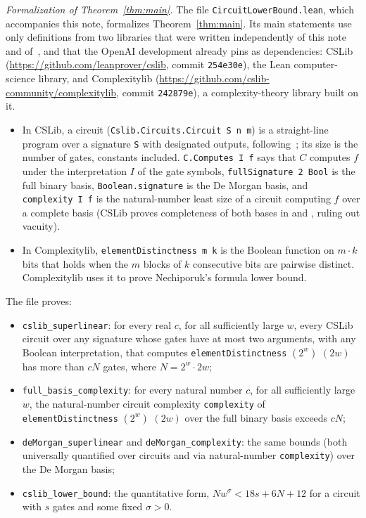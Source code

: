 \documentclass[11pt]{article}
\theoremstyle{definition}
\begin{document}
\emph{Formalization of Theorem~\ref{thm:main}.} The file \texttt{CircuitLowerBound.lean}, which accompanies this note, formalizes Theorem~\ref{thm:main}. Its main statements use only definitions from two libraries that were written independently of this note and of~\cite{OAI-MM}, and that the OpenAI development already pins as dependencies: CSLib (\url{https://github.com/leanprover/cslib}, commit \texttt{254e30e}), the Lean computer-science library, and Complexitylib (\url{https://github.com/cslib-community/complexitylib}, commit \texttt{242879e}), a complexity-theory library built on it.
\begin{itemize}
\item In CSLib, a circuit (\texttt{Cslib.Circuits.Circuit S n m}) is a straight-line program over a signature \texttt{S} with designated outputs, following~\cite[Section~6.1]{AB09}; its size is the number of gates, constants included. \texttt{C.Computes I f} says that $C$ computes $f$ under the interpretation $I$ of the gate symbols, \texttt{fullSignature 2 Bool} is the full binary basis, \texttt{Boolean.signature} is the De Morgan basis, and \texttt{complexity I f} is the natural-number least size of a circuit computing $f$ over a complete basis (CSLib proves completeness of both bases in  and , ruling out vacuity).
\item In Complexitylib, \texttt{elementDistinctness m k} is the Boolean function on $m\cdot k$ bits that holds when the $m$ blocks of $k$ consecutive bits are pairwise distinct. Complexitylib uses it to prove Nechiporuk's formula lower bound.
\end{itemize}
The file proves:
\begin{itemize}
\item \texttt{cslib\_superlinear}: for every real $c$, for all sufficiently large $w$, every CSLib circuit over any signature whose gates have at most two arguments, with any Boolean interpretation, that computes \texttt{elementDistinctness} $(2^w)$ $(2w)$ has more than $cN$ gates, where $N=2^w\cdot 2w$;
\item \texttt{full\_basis\_complexity}: for every natural number $c$, for all sufficiently large $w$, the natural-number circuit complexity \texttt{complexity} of \texttt{elementDistinctness} $(2^w)$ $(2w)$ over the full binary basis exceeds $cN$;
\item \texttt{deMorgan\_superlinear} and \texttt{deMorgan\_complexity}: the same bounds (both universally quantified over circuits and via natural-number \texttt{complexity}) over the De Morgan basis;
\item \texttt{cslib\_lower\_bound}: the quantitative form, $N w^{\sigma}<18s+6N+12$ for a circuit with $s$ gates and some fixed $\sigma>0$.
\end{itemize}
\end{document}
